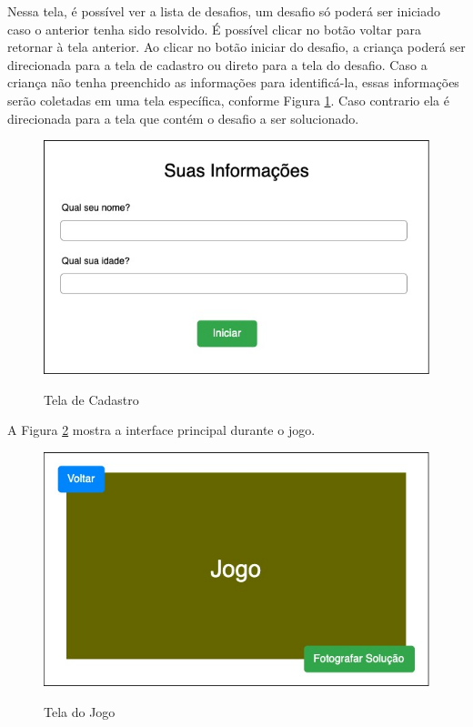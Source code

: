     Nessa tela, é possível ver a lista de desafios, um desafio só poderá ser iniciado caso o anterior tenha sido resolvido.
    É possível clicar no botão voltar para retornar à tela anterior.
    Ao clicar no botão iniciar do desafio, a criança poderá ser direcionada para a tela de cadastro ou direto para a tela do desafio.
    Caso a criança não tenha preenchido as informações para identificá-la, essas informações serão coletadas em uma tela específica, conforme Figura \ref{figura:cadastro}. Caso contrario ela é direcionada para a tela que contém o desafio a ser solucionado.
    
    \begin{figure}[H]
        \caption{Tela de Cadastro}
        \centering
        \includegraphics[width=\linewidth]{Imagens/cap3/informacoes_usuario.jpg}
        \label{figura:cadastro}
    \end{figure}
    
    A Figura \ref{figura:tela_jogo} mostra a interface principal durante o jogo.
    
    \begin{figure}[H]
        \caption{Tela do Jogo}
        \centering
        \includegraphics[width=\linewidth]{Imagens/cap3/tela_jogo.jpg}
        \label{figura:tela_jogo}
    \end{figure}
    
